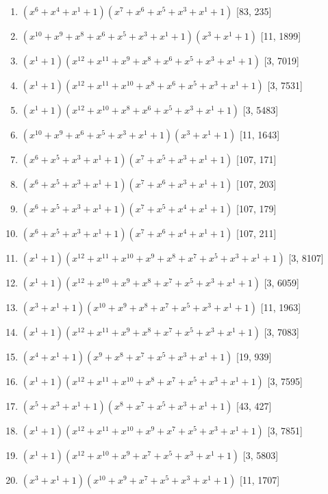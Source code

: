 \documentclass[10pt,twocolumn]{article}
\begin{document}
\begin{enumerate}
\item $(x^{6} + x^{4} + x^{1} + 1)(x^{7} + x^{6} + x^{5} + x^{3} + x^{1} + 1)$  [83, 235]
\item $(x^{10} + x^{9} + x^{8} + x^{6} + x^{5} + x^{3} + x^{1} + 1)(x^{3} + x^{1} + 1)$  [11, 1899]
\item $(x^{1} + 1)(x^{12} + x^{11} + x^{9} + x^{8} + x^{6} + x^{5} + x^{3} + x^{1} + 1)$  [3, 7019]
\item $(x^{1} + 1)(x^{12} + x^{11} + x^{10} + x^{8} + x^{6} + x^{5} + x^{3} + x^{1} + 1)$  [3, 7531]
\item $(x^{1} + 1)(x^{12} + x^{10} + x^{8} + x^{6} + x^{5} + x^{3} + x^{1} + 1)$  [3, 5483]
\item $(x^{10} + x^{9} + x^{6} + x^{5} + x^{3} + x^{1} + 1)(x^{3} + x^{1} + 1)$  [11, 1643]
\item $(x^{6} + x^{5} + x^{3} + x^{1} + 1)(x^{7} + x^{5} + x^{3} + x^{1} + 1)$  [107, 171]
\item $(x^{6} + x^{5} + x^{3} + x^{1} + 1)(x^{7} + x^{6} + x^{3} + x^{1} + 1)$  [107, 203]
\item $(x^{6} + x^{5} + x^{3} + x^{1} + 1)(x^{7} + x^{5} + x^{4} + x^{1} + 1)$  [107, 179]
\item $(x^{6} + x^{5} + x^{3} + x^{1} + 1)(x^{7} + x^{6} + x^{4} + x^{1} + 1)$  [107, 211]
\item $(x^{1} + 1)(x^{12} + x^{11} + x^{10} + x^{9} + x^{8} + x^{7} + x^{5} + x^{3} + x^{1} + 1)$  [3, 8107]
\item $(x^{1} + 1)(x^{12} + x^{10} + x^{9} + x^{8} + x^{7} + x^{5} + x^{3} + x^{1} + 1)$  [3, 6059]
\item $(x^{3} + x^{1} + 1)(x^{10} + x^{9} + x^{8} + x^{7} + x^{5} + x^{3} + x^{1} + 1)$  [11, 1963]
\item $(x^{1} + 1)(x^{12} + x^{11} + x^{9} + x^{8} + x^{7} + x^{5} + x^{3} + x^{1} + 1)$  [3, 7083]
\item $(x^{4} + x^{1} + 1)(x^{9} + x^{8} + x^{7} + x^{5} + x^{3} + x^{1} + 1)$  [19, 939]
\item $(x^{1} + 1)(x^{12} + x^{11} + x^{10} + x^{8} + x^{7} + x^{5} + x^{3} + x^{1} + 1)$  [3, 7595]
\item $(x^{5} + x^{3} + x^{1} + 1)(x^{8} + x^{7} + x^{5} + x^{3} + x^{1} + 1)$  [43, 427]
\item $(x^{1} + 1)(x^{12} + x^{11} + x^{10} + x^{9} + x^{7} + x^{5} + x^{3} + x^{1} + 1)$  [3, 7851]
\item $(x^{1} + 1)(x^{12} + x^{10} + x^{9} + x^{7} + x^{5} + x^{3} + x^{1} + 1)$  [3, 5803]
\item $(x^{3} + x^{1} + 1)(x^{10} + x^{9} + x^{7} + x^{5} + x^{3} + x^{1} + 1)$  [11, 1707]

\end{enumerate}
\end{document}
